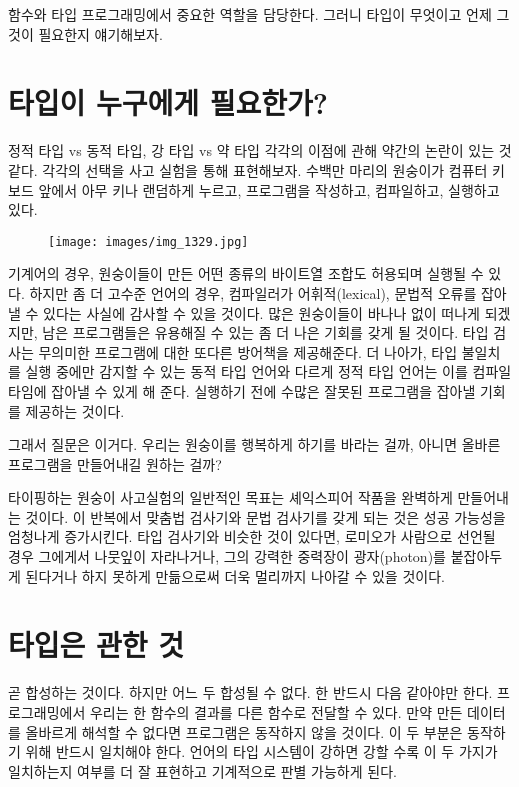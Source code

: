 
함수와 타입 \trCategory\는  프로그래밍에서 중요한 역할을 담당한다. 그러니 타입이 무엇이고 언제 그것이 필요한지 얘기해보자.

\section{타입이 누구에게 필요한가?}

정적 타입 vs 동적 타입, 강 타입 vs 약 타입 각각의 이점에 관해 약간의 논란이 있는 것 같다.
각각의 선택을 사고 실험을 통해 표현해보자. 수백만 마리의 원숭이가 컴퓨터 키보드 앞에서 아무 키나 랜덤하게 누르고, 프로그램을 작성하고, 컴파일하고, 실행하고 있다.

\begin{figure}[H]
\centering
\texttt{[image: images/img\_1329.jpg]}
\end{figure}

\noindent
기계어의 경우, 원숭이들이 만든 어떤 종류의 바이트열 조합도 허용되며 실행될 수 있다.
하지만 좀 더 고수준 언어의 경우, 컴파일러가 어휘적(lexical), 문법적 오류를 잡아낼 수 있다는 사실에 감사할 수 있을 것이다.
많은 원숭이들이 바나나 없이 떠나게 되겠지만, 남은 프로그램들은 유용해질 수 있는 좀 더 나은 기회를 갖게 될 것이다.
타입 검사는 무의미한 프로그램에 대한 또다른 방어책을 제공해준다.
더 나아가, 타입 불일치를 실행 중에만 감지할 수 있는 동적 타입 언어와 다르게 정적 타입 언어는 이를 컴파일 타임에 잡아낼 수 있게 해 준다.
실행하기 전에 수많은 잘못된 프로그램을 잡아낼 기회를 제공하는 것이다.

그래서 질문은 이거다. 우리는 원숭이를 행복하게 하기를 바라는 걸까, 아니면 올바른 프로그램을 만들어내길 원하는 걸까?

타이핑하는 원숭이 사고실험의 일반적인 목표는 셰익스피어 작품을 완벽하게 만들어내는 것이다.
이 반복에서 맞춤법 검사기와 문법 검사기를 갖게 되는 것은 성공 가능성을 엄청나게 증가시킨다.
타입 검사기와 비슷한 것이 있다면, 로미오가 사람으로 선언될 경우 그에게서 나뭇잎이 자라나거나, 그의 강력한 중력장이 광자(photon)를 붙잡아두게 된다거나 하지 못하게 만듦으로써 더욱 멀리까지 나아갈 수 있을 것이다.

\section{타입은  관한 것}

 곧 \trArrow\를 합성하는 것이다. 하지만 어느 두  합성될 수 없다. 
한  \trTargetObject\는 반드시 다음  \trSourceObject\와 같아야만 한다.
프로그래밍에서 우리는 한 함수의 결과를 다른 함수로 전달할 수 있다.
만약 \trTargetFunction\이  만든 데이터를 올바르게 해석할 수 없다면 프로그램은 동작하지 않을 것이다.
이 두 부분은 \trComposition\이 동작하기 위해 반드시 일치해야 한다.
언어의 타입 시스템이 강하면 강할 수록 이 두 가지가 일치하는지 여부를 더 잘 표현하고 기계적으로 판별 가능하게 된다.

